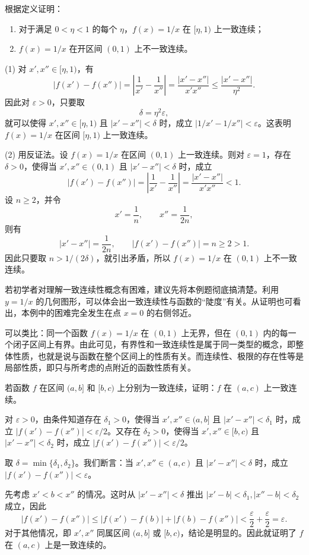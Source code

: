 \begin{xexample}[5.4.3]
根据定义证明：
\begin{enumerate}[label=(\arabic*)]
  \item 对于满足 $0<\eta<1$ 的每个 $\eta$，$f(x)=1/x$ 在 $[\eta,1)$ 上一致连续；
  \item $f(x)=1/x$ 在开区间 $(0,1)$ 上不一致连续。
\end{enumerate}
\end{xexample}
\begin{xproof}
(1) 对 $x',x''\in[\eta,1)$，有
\[
  |f(x')-f(x'')|=\left|\frac1{x'}-\frac1{x''}\right|=\frac{|x'-x''|}{x'x''}\le\frac{|x'-x''|}{\eta^2}.
\]
因此对 $\varepsilon>0$，只要取
\[
  \delta=\eta^2\varepsilon,
\]
就可以使得 $x',x''\in[\eta,1)$ 且 $|x'-x''|<\delta$ 时，成立 $|1/x'-1/x''|<\varepsilon$。这表明 $f(x)=1/x$ 在区间 $[\eta,1)$ 上一致连续。

(2) 用反证法。设 $f(x)=1/x$ 在区间 $(0,1)$ 上一致连续。则对 $\varepsilon=1$，存在 $\delta>0$，使得当 $x',x''\in(0,1)$ 且 $|x'-x''|<\delta$ 时，成立
\[
  |f(x')-f(x'')|=\left|\frac1{x'}-\frac1{x''}\right|=\frac{|x'-x''|}{x'x''}<1.
\]
设 $n\ge2$，并令
\[
  x'=\frac1n,\qquad x''=\frac1{2n},
\]
则有
\[
  |x'-x''|=\frac1{2n},\qquad |f(x')-f(x'')|=n\ge2>1.
\]
因此只要取 $n>1/(2\delta)$，就引出矛盾，所以 $f(x)=1/x$ 在 $(0,1)$ 上不一致连续。
\end{xproof}

\begin{xremark}
若初学者对理解一致连续性概念有困难，建议先将本例题彻底搞清楚。利用 $y=1/x$ 的几何图形，可以体会出一致连续性与函数的“陡度”有关。从证明也可看出，本例中的困难完全发生在点 $x=0$ 的右侧邻近。
\end{xremark}

\begin{xremark}
可以类比：同一个函数 $f(x)=1/x$ 在 $(0,1)$ 上无界，但在 $(0,1)$ 内的每一个闭子区间上有界。由此可见，有界性和一致连续性是属于同一类型的概念，即整体性质，也就是说与函数在整个区间上的性质有关。而连续性、极限的存在性等是局部性质，即只与所考虑的点附近的函数性质有关。
\end{xremark}

\begin{xexample}[5.4.4]
若函数 $f$ 在区间 $(a,b]$ 和 $[b,c)$ 上分别为一致连续，证明：$f$ 在 $(a,c)$ 上一致连续。
\end{xexample}
\begin{xproof}
对 $\varepsilon>0$，由条件知道存在 $\delta_1>0$，使得当 $x',x''\in(a,b]$ 且 $|x'-x''|<\delta_1$ 时，成立 $|f(x')-f(x'')|<\varepsilon/2$。又存在 $\delta_2>0$，使得当 $x',x''\in[b,c)$ 且 $|x'-x''|<\delta_2$ 时，成立 $|f(x')-f(x'')|<\varepsilon/2$。

取 $\delta=\min\{\delta_1,\delta_2\}$。我们断言：当 $x',x''\in(a,c)$ 且 $|x'-x''|<\delta$ 时，成立 $|f(x')-f(x'')|<\varepsilon$。

先考虑 $x'<b<x''$ 的情况。这时从 $|x'-x''|<\delta$ 推出 $|x'-b|<\delta_1,|x''-b|<\delta_2$ 成立，因此
\[
  |f(x')-f(x'')|\le|f(x')-f(b)|+|f(b)-f(x'')|<\frac\varepsilon2+\frac\varepsilon2=\varepsilon.
\]
对于其他情况，即 $x',x''$ 同属区间 $(a,b]$ 或 $[b,c)$，结论是明显的。因此就证明了 $f$ 在 $(a,c)$ 上是一致连续的。
\end{xproof}

